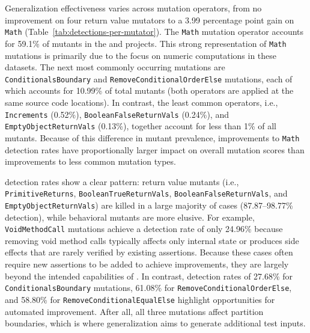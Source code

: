 Generalization effectiveness varies across mutation operators,
from no improvement on four return value mutators to a 3.99 percentage point gain on \texttt{Math}
(Table~\ref{tab:detections-per-mutator}).
The \texttt{Math} mutation operator accounts for 59.1\% of mutants
in the \DatasetsEqBenchEs{} and \DatasetsCommons{} projects.
This strong representation of \texttt{Math} mutations
is primarily due to the focus on numeric computations in these datasets.
The next most commonly occurring mutations are
\texttt{Conditionals\-Boundary} and \texttt{Remove\-Conditional\-Order\-Else}
mutations, each of which accounts for 10.99\% of total mutants
(both operators are applied at the same source code locations).
In contrast, the least common operators, i.e., \texttt{Increments} (0.52\%),
\texttt{Boolean\-False\-ReturnVals} (0.24\%),
and \texttt{Empty\-Object\-Return\-Vals} (0.13\%), together
account for less than 1\% of all mutants.
Because of this difference in mutant prevalence,
improvements to \texttt{Math} detection rates
have proportionally larger impact on overall mutation scores
than improvements to less common mutation types.



\VariantInitial{} detection rates show a clear pattern: return value mutants
(i.e., \texttt{Primitive\-Returns}, \texttt{Boolean\-True\-Return\-Vals},
\texttt{Boolean\-False\-Return\-Vals}, and \texttt{Empty\-Object\-Return\-Vals})
are killed in a large majority of cases (87.87--98.77\% detection),
while behavioral mutants are more elusive.
For example, \texttt{VoidMethodCall} mutations achieve a detection rate of only 24.96\%
because removing void method calls typically affects only internal state
or produces side effects that are rarely verified by existing assertions.
Because these cases often require new assertions to be added to achieve improvements,
they are largely beyond the intended capabilities of \ToolTeralizer{}.
In contrast, \VariantInitial{} detection rates of
27.68\% for \texttt{ConditionalsBoundary} mutations,
61.08\% for \texttt{RemoveConditionalOrderElse},
and 58.80\% for \texttt{RemoveConditionalEqualElse}
highlight opportunities for automated improvement.
After all, all three mutations
affect partition boundaries,
which is where \VariantImproved{} generalization
aims to generate additional test inputs.

